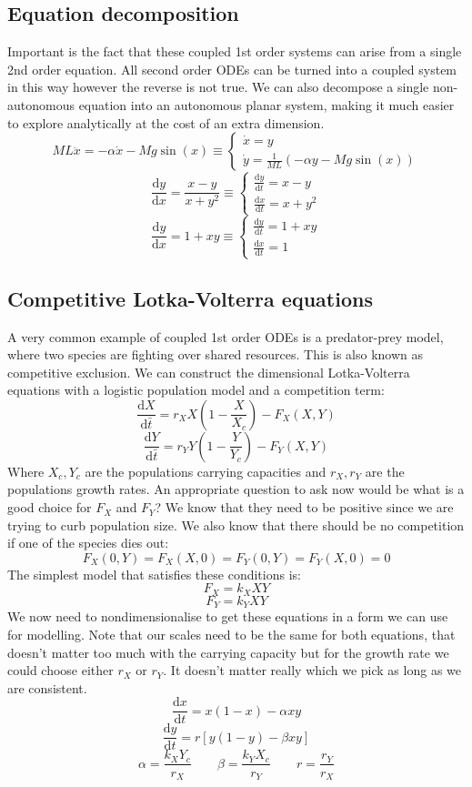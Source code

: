 \documentclass[12pt]{article}
\newcommand{\df}[2]{\frac{\text{d}#1}{\text{d}#2}}
\begin{document}
\subsection*{Equation decomposition}
Important is the fact that these coupled 1st order systems can arise from a single 2nd order equation. All second order ODEs can be turned into a coupled system in this way however the reverse is not true. We can also decompose a single non-autonomous equation into an autonomous planar system, making it much easier to explore analytically at the cost of an extra dimension.
\[ML\ddot{x}=-\alpha\dot{x}-Mg\sin(x)\equiv\begin{cases}
    \dot{x}=y \\
    \dot{y}=\frac{1}{ML}(-\alpha y-Mg\sin(x))
\end{cases}\]
\[\df{y}{x}=\frac{x-y}{x+y^2}\equiv\begin{cases}
    \df{y}{t}=x-y \\
    \df{x}{t}=x+y^2
\end{cases}\]
\[\df{y}{x}=1+xy\equiv\begin{cases}
    \df{y}{t}=1+xy \\
    \df{x}{t}=1
\end{cases}\]
\subsection*{Competitive Lotka-Volterra equations}
A very common example of coupled 1st order ODEs is a predator-prey model, where two species are fighting over shared resources. This is also known as competitive exclusion. We can construct the dimensional Lotka-Volterra equations with a logistic population model and a competition term:
\[\df{X}{\bar{t}}=r_XX\left(1-\frac{X}{X_c}\right)-F_X(X,Y)\]
\[\df{Y}{\bar{t}}=r_YY\left(1-\frac{Y}{Y_c}\right)-F_Y(X,Y)\]
Where \(X_c,Y_c\) are the populations carrying capacities and \(r_X,r_Y\) are the populations growth rates. An appropriate question to ask now would be what is a good choice for \(F_X\) and \(F_Y\)? We know that they need to be positive since we are trying to curb population size. We also know that there should be no competition if one of the species dies out:
\[F_X(0,Y)=F_X(X,0)=F_Y(0,Y)=F_Y(X,0)=0\]
The simplest model that satisfies these conditions is:
\[F_X=k_XXY\]
\[F_Y=k_YXY\]
We now need to nondimensionalise to get these equations in a form we can use for modelling. Note that our scales need to be the same for both equations, that doesn't matter too much with the carrying capacity but for the growth rate we could choose either \(r_X\) or \(r_Y\). It doesn't matter really which we pick as long as we are consistent.
\[\df{x}{t}=x(1-x)-\alpha xy\]
\[\df{y}{t}=r[y(1-y)-\beta xy]\]
\[\alpha=\frac{k_XY_c}{r_X}\qquad \beta=\frac{k_YX_c}{r_Y}\qquad r=\frac{r_Y}{r_X}\]
\end{document}
